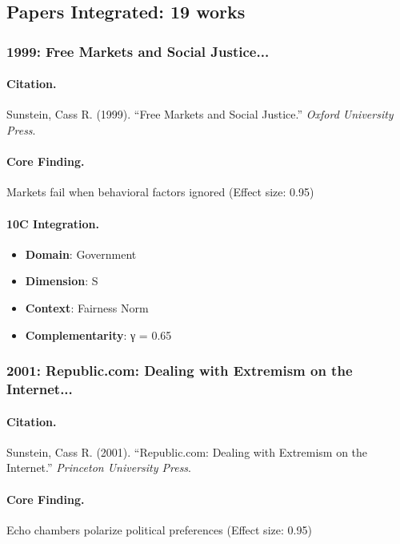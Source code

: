 \subsection{Papers Integrated: 19 works}

\subsubsection{1999: Free Markets and Social Justice...}

\paragraph{Citation.}
Sunstein, Cass R. (1999). ``Free Markets and Social Justice.''
\textit{Oxford University Press}.

\paragraph{Core Finding.}
Markets fail when behavioral factors ignored (Effect size: 0.95)

\paragraph{10C Integration.}
\begin{itemize}[nosep]
  \item \textbf{Domain}: Government
  \item \textbf{Dimension}: S
  \item \textbf{Context}: Fairness Norm
  \item \textbf{Complementarity}: γ = 0.65
\end{itemize}

\subsubsection{2001: Republic.com: Dealing with Extremism on the Internet...}

\paragraph{Citation.}
Sunstein, Cass R. (2001). ``Republic.com: Dealing with Extremism on the Internet.''
\textit{Princeton University Press}.

\paragraph{Core Finding.}
Echo chambers polarize political preferences (Effect size: 0.95)

